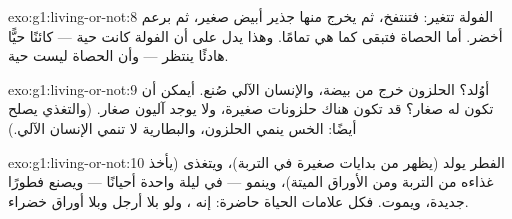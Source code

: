 \begin{solution}{exo:g1:living-or-not:8}
الفولة تتغير: فتنتفخ، ثم يخرج منها جذير أبيض صغير، ثم برعم أخضر.
أما الحصاة فتبقى كما هي تمامًا. وهذا يدل على أن الفولة كانت حية
--- كائنًا حيًّا هادئًا ينتظر --- وأن الحصاة ليست حية.
\end{solution}

\begin{solution}{exo:g1:living-or-not:9}
أوُلد؟ الحلزون خرج من بيضة، والإنسان الآلي صُنع. أيمكن أن تكون له
صغار؟ قد تكون هناك حلزونات صغيرة، ولا يوجد آليون صغار. (والتغذي
يصلح أيضًا: الخس ينمي الحلزون، والبطارية لا تنمي الإنسان الآلي.)
\end{solution}

\begin{solution}{exo:g1:living-or-not:10}
الفطر يولد (يظهر من بدايات صغيرة في التربة)، ويتغذى (يأخذ غذاءه
من التربة ومن الأوراق الميتة)، وينمو --- في ليلة واحدة أحيانًا ---
ويصنع فطورًا جديدة، ويموت. فكل علامات الحياة حاضرة: إنه ،
ولو بلا أرجل وبلا أوراق خضراء.
\end{solution}

